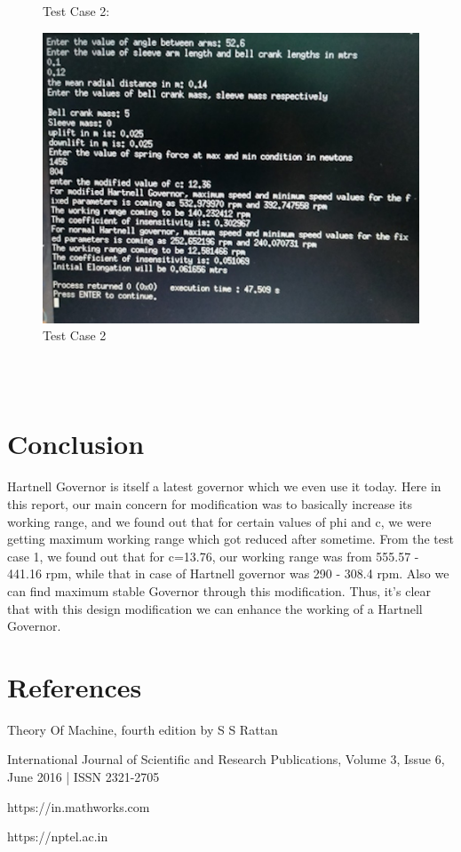 \documentclass[15pt,a4paper,oneside]{article}
\begin{document}
\begin{figure}[p]
	Test Case 2:\\
	\centerline{\includegraphics[scale=0.6]{testcase 2 results.png}}
	\caption{Test Case 2}
	\label{fig}
\end{figure}\\
\\[5cm]
\pagebreak
\section{Conclusion}
Hartnell Governor is itself a latest governor which we even use it today. Here in this report, our main concern for modification was to basically increase its working range, and we found out that for certain values of phi and c, we were getting maximum working range which got reduced after sometime. From the test case 1, we found out that for c=13.76, our working range was from 555.57 - 441.16 rpm, while that in case of Hartnell governor was 290 - 308.4 rpm. Also we can find maximum stable Governor through this modification. Thus, it's clear that with this design modification we can enhance the working of a Hartnell Governor.
\section{References}
\bibitem{}Theory Of Machine, fourth edition by S S Rattan

\bibitem{}  International Journal of Scientific and Research Publications, Volume 3, Issue 6, June 2016 | ISSN 2321-2705

\bibitem{} https://in.mathworks.com

\bibitem{} https://nptel.ac.in
\end{document}
